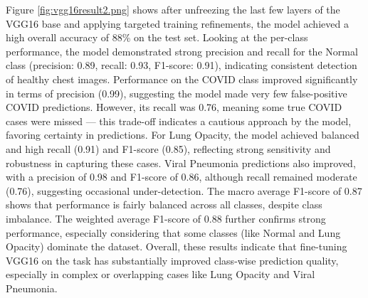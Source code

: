 \documentclass{article}
\begin{document}
Figure \ref{fig:vgg16result2.png} shows after unfreezing the last few layers of the VGG16 base and applying targeted training refinements, the model achieved a high overall accuracy of 88\% on the test set. Looking at the per-class performance, the model demonstrated strong precision and recall for the Normal class (precision: 0.89, recall: 0.93, F1-score: 0.91), indicating consistent detection of healthy chest images.
Performance on the COVID class improved significantly in terms of precision (0.99), suggesting the model made very few false-positive COVID predictions. However, its recall was 0.76, meaning some true COVID cases were missed — this trade-off indicates a cautious approach by the model, favoring certainty in predictions.
For Lung Opacity, the model achieved balanced and high recall (0.91) and F1-score (0.85), reflecting strong sensitivity and robustness in capturing these cases. Viral Pneumonia predictions also improved, with a precision of 0.98 and F1-score of 0.86, although recall remained moderate (0.76), suggesting occasional under-detection.
The macro average F1-score of 0.87 shows that performance is fairly balanced across all classes, despite class imbalance. The weighted average F1-score of 0.88 further confirms strong performance, especially considering that some classes (like Normal and Lung Opacity) dominate the dataset.
Overall, these results indicate that fine-tuning VGG16 on the task has substantially improved class-wise prediction quality, especially in complex or overlapping cases like Lung Opacity and Viral Pneumonia.
\end{document}
